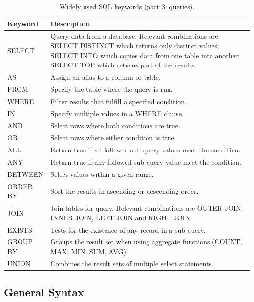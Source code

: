 \begin{table}
	\centering \caption{Widely used SQL keywords (part 3: queries).}\label{ch:db:tab:sqlkeywords3}
	\begin{tabularx}{\textwidth}{lX}
		\hline
		Keyword & Description \\ \hline
		SELECT & Query data from a database. Relevant combinations are SELECT DISTINCT which returns only distinct values; SELECT INTO which copies data from one table into another; SELECT TOP which returns part of the results. \\ \hdashline
		AS & Assign an alias to a column or table. \\ \hdashline
		FROM & Specify the table where the query is run. \\ \hdashline
		WHERE & Filter results that fulfill a specified condition. \\ \hdashline
		IN & Specify multiple values in a WHERE clause. \\ \hdashline
		AND & Select rows where both conditions are true. \\ \hdashline
		OR & Select rows where either condition is true. \\ \hdashline
		ALL & Return true if all followed sub-query values meet the condition. \\ \hdashline
		ANY & Return true if any followed sub-query value meet the condition. \\ \hdashline
		BETWEEN & Select values within a given range. \\ \hdashline
		ORDER BY & Sort the results in ascending or descending order. \\ \hdashline
		JOIN & Join tables for query. Relevant combinations are OUTER JOIN, INNER JOIN, LEFT JOIN and RIGHT JOIN. \\ \hdashline
		EXISTS & Tests for the existence of any record in a sub-query. \\ \hdashline
		GROUP BY & Groups the result set when using aggregate functions (COUNT, MAX, MIN, SUM, AVG). \\ \hdashline
		UNION & Combines the result sets of multiple select statements. \\
		 \hline
	\end{tabularx}
\end{table}

\subsection{General Syntax}

